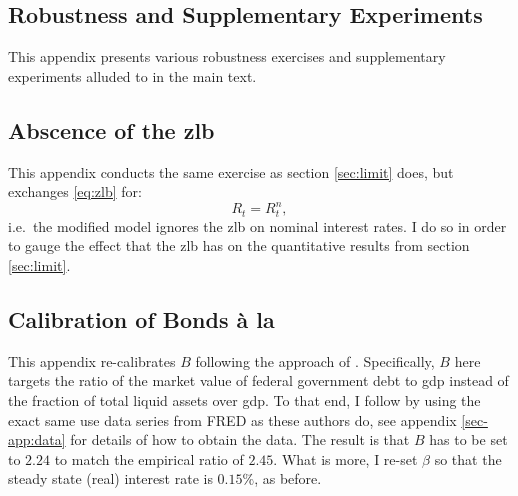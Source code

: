 \documentclass[12pt]{article} %
\numberwithin{equation}{section} %
\numberwithin{figure}{section}
\numberwithin{table}{section}
\begin{document}
\begin{refsection}
\begin{appendices}
\thispagestyle{plain}
\section{Robustness and Supplementary Experiments}
\label{sec-app:robust}

This appendix presents various robustness exercises and supplementary experiments alluded to in the main text.

\subsection{Abscence of the \Gls{zlb}}
\label{sec-app:robust-no-zlb}

This appendix conducts the same exercise as section \ref{sec:limit} does, but exchanges \eqref{eq:zlb} for:
\begin{equation}
    R_t = R^n_t, \label{eq:no-zlb}
\end{equation}
i.e.~the modified model ignores the \Gls{zlb} on nominal interest rates. I do so in order to gauge the effect that the \Gls{zlb} has on the quantitative results from section \ref{sec:limit}.



\subsection{Calibration of Bonds à la \textcite{bayer2023}}
\label{sec-app:robust-bonds}

This appendix re-calibrates $B$ following the approach of \textcite{bayer2023}. Specifically, $B$ here targets the ratio of the market value of federal government debt to \Gls{gdp} instead of the fraction of total liquid assets over \Gls{gdp}. To that end, I follow \textcite{bayer2023} by using the exact same use data series from FRED as these authors do, see appendix \ref{sec-app:data} for details of how to obtain the data. The result is that $B$ has to be set to $2.24$ to match the empirical ratio of $2.45$. What is more, I re-set $\beta$ so that the steady state (real) interest rate is $0.15\%$, as before.


\end{appendices}
\end{refsection}
\end{document}
